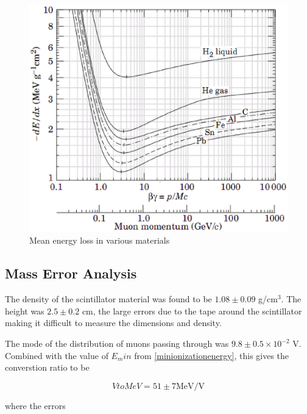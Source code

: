 \label{energy_loss}
\begin{figure}[h]
\begin{center}
\includegraphics[width = 130mm]{figures/energy_loss.eps}
\caption{\small{Mean energy loss in various materials \cite{yao.}}}
\label{figure:dEdx}
\end{center}
\end{figure}

\subsection{Mass Error Analysis}

The density of the scintillator material was found to be $1.08 \pm
0.09$ g/cm$^3$. The height was $2.5 \pm 0.2$ cm, the large errors due
to the tape around the scintillator making it difficult to measure the
dimensions and density.

The mode of the distribution of muons passing through was $9.8 \pm 0.5
\times 10^{-2}$ V.  Combined with the value of $E_min$ from
\ref{minionizationenergy}, this gives the converstion ratio to be

\begin{equation} VtoMeV = 51 \pm 7 \mathrm{ MeV/V} \end{equation}   

where the errors 

